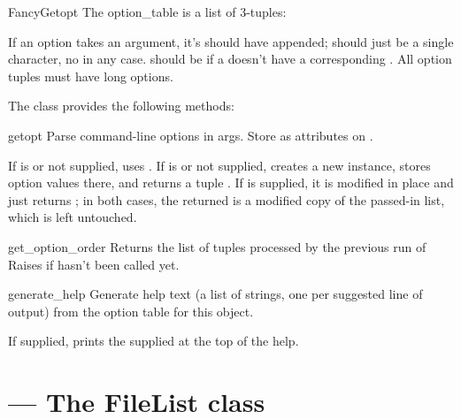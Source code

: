 \documentclass{manual}
\begin{document}
\begin{classdesc}{FancyGetopt}{}
The option_table is a list of 3-tuples: 

If an option takes an argument, it's  should have 
appended;  should just be a single character, no 
in any case.  should be  if a  
doesn't have a corresponding . All option tuples must have
long options.
\end{classdesc}

The  class provides the following methods:

\begin{methoddesc}{getopt}{}
Parse command-line options in args. Store as attributes on .

If  is  or not supplied, uses .  If
 is  or not supplied, creates a new 
instance, stores option values there, and returns a tuple .  If  is supplied, it is modified in place and
 just returns ; in both cases, the returned
 is a modified copy of the passed-in  list, which
is left untouched.
\end{methoddesc}

\begin{methoddesc}{get_option_order}{}
Returns the list of  tuples processed by the
previous run of   Raises  if
 hasn't been called yet.
\end{methoddesc}

\begin{methoddesc}{generate_help}{}
Generate help text (a list of strings, one per suggested line of
output) from the option table for this  object.

If supplied, prints the supplied  at the top of the help.
\end{methoddesc}

\section{ --- The FileList class}
\end{document}
